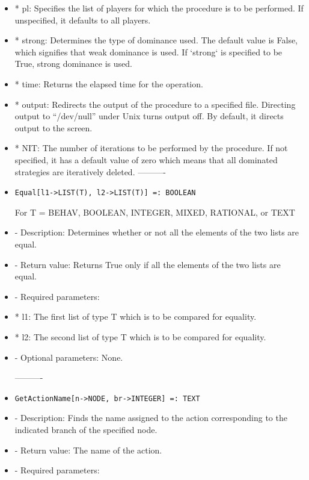 \begin{itemize}
\bd
\item
*  pl:  Specifies the list of players for which the procedure is to
be performed.  If unspecified, it defaults to all players. 
\item
*  strong:  Determines the type of dominance used.  The default value
is False, which signifies that weak dominance is used.  If `strong` 
is specified to be True, strong dominance is used.  
\item
*  time:  Returns the elapsed time for the operation.
\item
*  output:  Redirects the output of the procedure to a specified 
file.  Directing output to ``/dev/null'' under Unix turns 
output off.  By default, it directs output to the screen.
\item
*  NIT:  The number of iterations to be performed by the procedure.
If not specified, it has a default value of zero which means 
that all dominated strategies are iteratively deleted.
\ed
\ed
----------

\item
\begin{verbatim}
Equal[l1->LIST(T), l2->LIST(T)] =: BOOLEAN
\end{verbatim}

	For T = BEHAV, BOOLEAN, INTEGER, MIXED, RATIONAL, or TEXT

\bd
\item
- Description:  Determines whether or not all the elements of the two
lists are equal.
\item
- Return value:  Returns True only if all the elements of the two lists
are equal.
\item
- Required parameters:  
	
\bd
\item
*  l1:  The first list of type T which is to be compared for equality.
\item
*  l2:  The second list of type T which is to be compared for 
equality.
\ed

\item
- Optional parameters:  None.

\ed
----------

\item
\begin{verbatim}
GetActionName[n->NODE, br->INTEGER] =: TEXT
\end{verbatim}

\bd
\item
- Description:  Finds the name assigned to the action corresponding to 
the indicated branch of the specified node.
\item   
- Return value:  The name of the action.
\item
- Required parameters:
	

\end{itemize}
